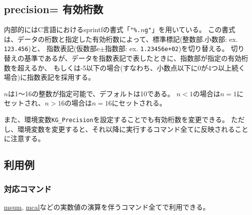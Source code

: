 
%

\subsection{precision= 有効桁数\label{sect:option_precision}}
内部的にはC言語におけるsprintfの書式「\verb|"%.|$n$\verb|g"|」を用いている。
この書式は、データの桁数と指定した有効桁数によって、標準標記(整数部.小数部: ex. \verb|123.456|)と、
指数表記(仮数部e$\pm$指数部: ex. \verb|1.23456e+02|)を切り替える。
切り替えの基準であるが、データを指数表記で表したときに、指数部が指定の有効桁数を超えるか、
もしくは-5以下の場合(すなわち、小数点以下に0が4つ以上続く場合)に指数表記を採用する。

$n$は1〜16の整数が指定可能で、デフォルトは10である。
$n<1$の場合は$n=1$にセットされ、$n>16$の場合は$n=16$にセットされる。

また、環境変数\verb|KG_Precision|を設定することでも有効桁数を変更できる。
ただし、環境変数を変更すると、それ以降に実行するコマンド全てに反映されることに注意する。

\subsection*{利用例}


\subsubsection*{対応コマンド}
\hyperref[sect:msum]{msum},
\hyperref[sect:mcal]{mcal}などの実数値の演算を伴うコマンド全てで利用できる。

%

